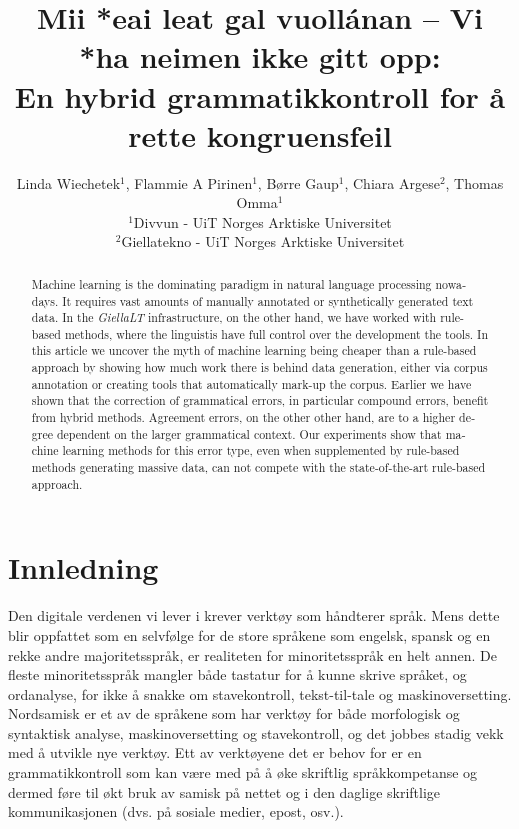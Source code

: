 \documentclass{flammie}
\title{Mii *eai leat gal vuollánan -- Vi *ha neimen ikke gitt opp: \\ En hybrid grammatikkontroll for å rette kongruensfeil}
\author{Linda Wiechetek$^1$,  Flammie A Pirinen$^1$,  Børre Gaup$^1$,
Chiara Argese$^2$,  Thomas Omma$^1$\\
$^1$Divvun - UiT Norges Arktiske Universitet \\ $^2$Giellatekno - UiT Norges Arktiske Universitet}
\begin{document}
\setcounter{page}{287}
\maketitle

\begin{abstract}




\begin{english}

    Machine learning is the dominating paradigm in natural language processing
    nowadays.  It requires vast amounts of manually annotated or synthetically
    generated text data.  In the \textit{GiellaLT} infrastructure, on the other
    hand, we have worked with rule-based methods, where the linguistis have full
    control over the development the tools.  In this article we uncover the myth
    of machine learning being cheaper than a rule-based approach by showing how
    much work there is behind data generation, either via corpus annotation or
    creating tools that automatically mark-up the corpus.  Earlier we have shown
    that the correction of grammatical errors, in particular compound errors,
    benefit from hybrid methods.  Agreement errors, on the other other hand, are
    to a higher degree dependent on the larger grammatical context.  Our
    experiments show that machine learning methods for this error type, even
    when supplemented by rule-based methods generating massive data, can not
    compete with the state-of-the-art rule-based approach.

\end{english}

\end{abstract}

\section{Innledning}

Den digitale verdenen vi lever i krever verktøy som håndterer språk.  Mens dette
blir oppfattet som en selvfølge for de store språkene som engelsk, spansk og en
rekke andre majoritetsspråk, er realiteten for minoritetsspråk en helt annen.
De fleste minoritetsspråk mangler både tastatur for å kunne skrive språket, og
ordanalyse, for ikke å snakke om stavekontroll, tekst-til-tale og
maskinoversetting.  Nordsamisk er et av de språkene som har verktøy for både
morfologisk og syntaktisk analyse, maskinoversetting og stavekontroll, og det
jobbes stadig vekk med å utvikle nye verktøy.  Ett av verktøyene det er behov
for er en grammatikkontroll som kan være med på å øke skriftlig språkkompetanse
og dermed føre til økt bruk av samisk på nettet og i den daglige skriftlige
kommunikasjonen (dvs. på sosiale medier, epost, osv.).
\end{document}
